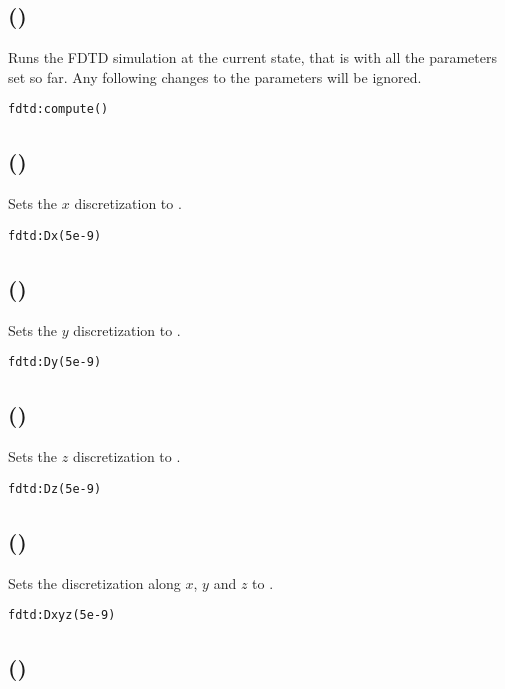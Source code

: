 \subsection[compute]{()}

Runs the FDTD simulation at the current state, that is with all the parameters set so far. Any following changes to the parameters will be ignored.
\begin{lstlisting}
fdtd:compute()
\end{lstlisting}


\subsection[Dx]{()}

Sets the $x$ discretization to .
\begin{lstlisting}
fdtd:Dx(5e-9)
\end{lstlisting}

\subsection[Dy]{()}

Sets the $y$ discretization to .
\begin{lstlisting}
fdtd:Dy(5e-9)
\end{lstlisting}

\subsection[Dz]{()}

Sets the $z$ discretization to .
\begin{lstlisting}
fdtd:Dz(5e-9)
\end{lstlisting}

\subsection[Dxyz]{()}

Sets the discretization along $x$, $y$ and $z$ to .
\begin{lstlisting}
fdtd:Dxyz(5e-9)
\end{lstlisting}

\subsection[N\_tsteps]{()}

